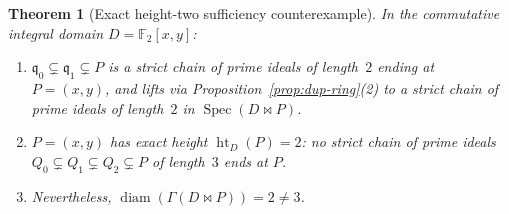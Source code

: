 \documentclass[11pt]{article}
\newtheorem{theorem}{Theorem}[section]
\theoremstyle{definition}
\newcommand{\Spec}{\operatorname{Spec}}
\newcommand{\diam}{\operatorname{diam}}
\newcommand{\htop}{\operatorname{ht}}
\newcommand{\FF}{\mathbb{F}}
\begin{document}
\begin{theorem}[Exact height-two sufficiency counterexample]\label{thm:f2xy}
In the commutative integral domain $D = \FF_2[x, y]$:
\begin{enumerate}
  \item $\mathfrak{q}_0 \subsetneq \mathfrak{q}_1 \subsetneq P$ is a strict chain of prime
  ideals of length~$2$ ending at $P = (x, y)$, and lifts via Proposition~\ref{prop:dup-ring}(2)
  to a strict chain of prime ideals of length~$2$ in $\Spec(D \bowtie P)$.
  \item $P = (x, y)$ has \emph{exact} height $\htop_D(P) = 2$: no strict chain of prime
  ideals $Q_0 \subsetneq Q_1 \subsetneq Q_2 \subsetneq P$ of length~$3$ ends at $P$.
  \item Nevertheless, $\diam(\Gamma(D \bowtie P)) = 2 \neq 3$.
\end{enumerate}
\end{theorem}
\end{document}
